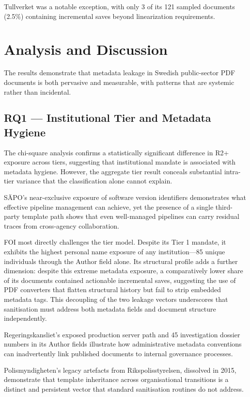 \documentclass[conference]{IEEEtran}
\begin{document}
Tullverket was a notable exception, with only 3 of its 121 sampled documents (2.5\%) containing incremental saves beyond linearization requirements.

\section{Analysis and Discussion}
The results demonstrate that metadata leakage in Swedish public-sector PDF documents is both pervasive and measurable, with patterns that are systemic rather than incidental.

\subsection{RQ1 --- Institutional Tier and Metadata Hygiene}
The chi-square analysis confirms a statistically significant difference in R2+ exposure across tiers, suggesting that institutional mandate is associated with metadata hygiene. However, the aggregate tier result conceals substantial intra-tier variance that the classification alone cannot explain.

SÄPO's near-exclusive exposure of software version identifiers demonstrates what effective pipeline management can achieve, yet the presence of a single third-party template path shows that even well-managed pipelines can carry residual traces from cross-agency collaboration.

FOI most directly challenges the tier model. Despite its Tier 1 mandate, it exhibits the highest personal name exposure of any institution---85 unique individuals through the Author field alone. Its structural profile adds a further dimension: despite this extreme metadata exposure, a comparatively lower share of its documents contained actionable incremental saves, suggesting the use of PDF converters that flatten structural history but fail to strip embedded metadata tags. This decoupling of the two leakage vectors underscores that sanitisation must address both metadata fields and document structure independently.

Regeringskansliet's exposed production server path and 45 investigation dossier numbers in its Author fields illustrate how administrative metadata conventions can inadvertently link published documents to internal governance processes.

Polismyndigheten's legacy artefacts from Rikspolisstyrelsen, dissolved in 2015, demonstrate that template inheritance across organisational transitions is a distinct and persistent vector that standard sanitisation routines do not address.
\end{document}
